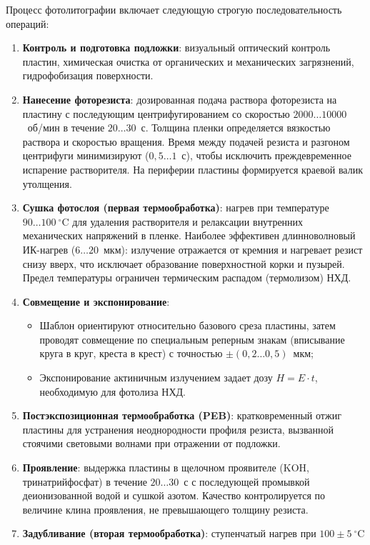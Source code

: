\documentclass[12pt,a4paper]{article}
\theoremstyle{plain}
\theoremstyle{definition}
\theoremstyle{remark}
\numberwithin{equation}{section}
\begin{document}
Процесс фотолитографии включает следующую строгую последовательность операций:
\begin{enumerate}
  \item \textbf{Контроль и подготовка подложки}: визуальный оптический контроль пластин, химическая 
  очистка от органических и механических загрязнений, гидрофобизация поверхности.
  \item \textbf{Нанесение фоторезиста}: дозированная подача раствора фоторезиста на пластину с 
  последующим центрифугированием со скоростью $2000 \dots 10000$~об/мин в течение $20 \dots 30$~с. 
  Толщина пленки определяется вязкостью раствора и скоростью вращения. Время между подачей резиста 
  и разгоном центрифуги минимизируют ($0{,}5 \dots 1$~с), чтобы исключить преждевременное испарение 
  растворителя. На периферии пластины формируется краевой валик утолщения.
  \item \textbf{Сушка фотослоя (первая термообработка)}: нагрев при температуре $90 \dots 100~^\circ\mathrm{C}$ 
  для удаления растворителя и релаксации внутренних механических напряжений в пленке. Наиболее 
  эффективен длинноволновый ИК-нагрев ($6 \dots 20$~мкм): излучение отражается от кремния и нагревает 
  резист снизу вверх, что исключает образование поверхностной корки и пузырей. Предел температуры 
  ограничен термическим распадом (термолизом) НХД.
  \item \textbf{Совмещение и экспонирование}:
  \begin{itemize}
    \item Шаблон ориентируют относительно базового среза пластины, затем проводят совмещение по 
    специальным реперным знакам (вписывание круга в круг, креста в крест) с точностью $\pm (0{,}2 \dots 0{,}5)$~мкм;
    \item Экспонирование актиничным излучением задает дозу $H = E \cdot t$, необходимую для фотолиза НХД.
  \end{itemize}
  \item \textbf{Постэкспозиционная термообработка (PEB)}: кратковременный отжиг пластины для устранения 
  неоднородности профиля резиста, вызванной стоячими световыми волнами при отражении от подложки.
  \item \textbf{Проявление}: выдержка пластины в щелочном проявителе ($\mathrm{KOH}$, тринатрийфосфат) 
  в течение $20 \dots 30$~с с последующей промывкой деионизованной водой и сушкой азотом. Качество 
  контролируется по величине клина проявления, не превышающего толщину резиста.
  \item \textbf{Задубливание (вторая термообработка)}: ступенчатый нагрев при $100 \pm 5~^\circ\mathrm{C}$ 

\end{enumerate}
\end{document}
